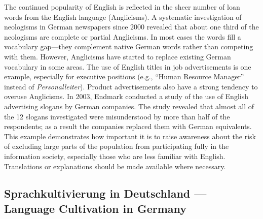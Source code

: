 \documentclass[]{../../metanetpaper}
\begin{document}
\begin{Parallel}[c]{80mm}{80mm}
{    The continued popularity of English is reflected in the sheer number of loan words from the English language (Anglicisms). A systematic investigation of neologisms in German newspapers since 2000 revealed that about one third of the neologisms are complete or partial Anglicisms\cite{Lemni1}. In most cases the words fill a vocabulary gap—they complement native German words rather than competing with them. However, Anglicisms have started to replace existing German vocabulary in some areas. The use of English titles in job advertisements is one example, especially for executive positions (e.g., “Human Resource Manager” instead of \textit{Personalleiter}). Product advertisements also have a strong tendency to overuse Anglicisms. In 2003, Endmark conducted a study of the use of English advertising slogans by German companies. The study revealed that almost all of the 12 slogans investigated were misunderstood by more than half of the respondents; as a result the companies replaced them with German equivalents. This example demonstrates how important it is to raise awareness about the risk of excluding large parts of the population from participating fully in the information society, especially those who are less familiar with English. Translations or explanations should be made available where necessary.
  }

  \ParallelPar


  \subsection{Sprachkultivierung in Deutschland --- Language Cultivation in Germany}

\end{Parallel}
\end{document}
